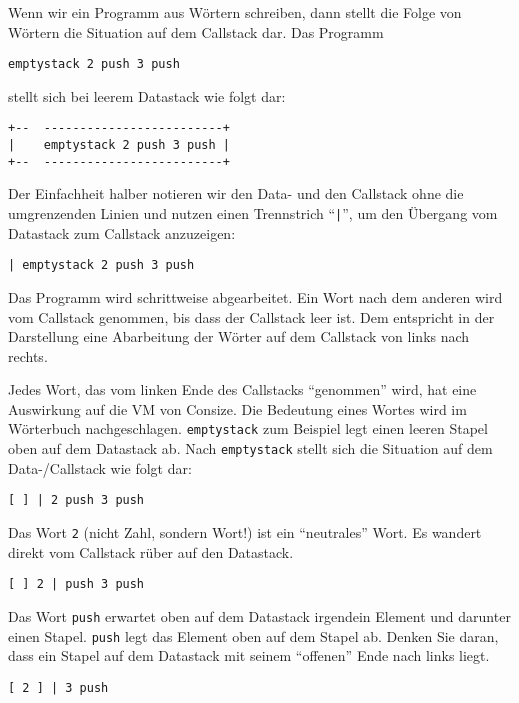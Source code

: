 Wenn wir ein Programm aus Wörtern schreiben, dann stellt die Folge von Wörtern die Situation auf dem Callstack dar. Das Programm

\begin{verbatim}
emptystack 2 push 3 push
\end{verbatim}

stellt sich bei leerem Datastack wie folgt dar:

\begin{verbatim}
+--  -------------------------+
|    emptystack 2 push 3 push |
+--  -------------------------+
\end{verbatim}

Der Einfachheit halber notieren wir den Data- und den Callstack ohne die umgrenzenden Linien und nutzen einen Trennstrich "`\verb!|!"', um den Übergang vom Datastack zum Callstack anzuzeigen:

\begin{verbatim}
| emptystack 2 push 3 push
\end{verbatim}

Das Programm wird schrittweise abgearbeitet. Ein Wort nach dem anderen wird vom Callstack genommen, bis dass der Callstack leer ist. Dem entspricht in der Darstellung eine Abarbeitung der Wörter auf dem Callstack von links nach rechts.

Jedes Wort, das vom linken Ende des Callstacks "`genommen"' wird, hat eine Auswirkung auf die VM von Consize. Die Bedeutung eines Wortes wird im Wörterbuch nachgeschlagen. \verb|emptystack| zum Beispiel legt einen leeren Stapel oben auf dem Datastack ab. Nach \verb|emptystack| stellt sich die Situation auf dem Data-\slash Callstack wie folgt dar:

\begin{verbatim}
[ ] | 2 push 3 push  
\end{verbatim}

Das Wort \verb|2| (nicht Zahl, sondern Wort!) ist ein "`neutrales"' Wort. Es wandert direkt vom Callstack rüber auf den Datastack.

\begin{verbatim}
[ ] 2 | push 3 push
\end{verbatim}

Das Wort \verb|push| erwartet oben auf dem Datastack irgendein Element und darunter einen Stapel. \verb|push| legt das Element oben auf dem Stapel ab. Denken Sie daran, dass ein Stapel auf dem Datastack mit seinem "`offenen"' Ende nach links liegt. 

\begin{verbatim}
[ 2 ] | 3 push
\end{verbatim}

